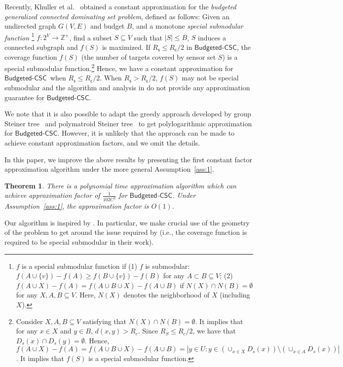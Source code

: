 \documentclass[11pt]{article}
\newcommand{\Z}{\mathbb{Z}}
\newcommand{\rednote}[1]{#1}
\newcommand{\bcsc}{$\mathsf{Budgeted}$-$\mathsf{CSC}$}
\newcommand{\Rc}{R_\mathsf{c}}
\newcommand{\Rs}{R_\mathsf{s}}
\newtheorem{theorem}{Theorem}
\begin{document}
Recently, Khuller et al.~\cite{khuller2014analyzing} obtained
a constant approximation for the {\em budgeted generalized connected dominating set problem},
defined as follows: Given an undirected graph $G(V,E)$ and budget $B$, and a  monotone {\em special submodular function}
\footnote{
	$f$ is a special submodular function if (1) $f$ is submodular:
	$f(A\cup\{v\})-f(A)\geq f(B\cup \{v\})-f(B)$ for any $A\subset B\subseteq V$;
	(2) $f(A\cup X)-f(A)=f(A\cup B\cup X)-f(A\cup B)$ if $N(X)\cap N(B)=\emptyset$
	for any $X,A,B\subseteq V$. Here, $N(X)$ denotes the neighborhood of $X$ (including $X$).
} $f: 2^V\rightarrow \Z^+$, find a subset $S\subseteq V$ such that $|S|\leq B$,
$S$ induces a connected subgraph
and $f(S)$ is maximized.
If $\Rs\leq \Rc/2$ in \bcsc, the coverage function $f(S)$ (the number of targets covered by sensor set $S$) is a special submodular function.\footnote{\rednote{Consider $X,A,B\subseteq V$ satisfying that $N(X)\cap N(B)=\emptyset$. It implies that for any $x\in X$ and $y\in B$, $d(x,y)> R_c$. Since $R_S\leq R_c/2$, we have that $D_s(x)\cap D_s(y)=\emptyset$. Hence, $f(A\cup X)-f(A)=f(A\cup B\cup X)-f(A\cup B) = \left|y\in U: y\in (\cup_{x\in X} D_s(x))\setminus (\cup_{x\in A} D_s(x)) \right|$. It implies that $f(S)$ is a special submodular function.}} 
Hence, we have a constant approximation
for \bcsc\ when $\Rs\leq \Rc/2$.
When $\Rs> \Rc/2$, $f(S)$ may not be special submodular and the algorithm and analysis
in \cite{khuller2014analyzing} do not provide any approximation guarantee for \bcsc.

We note that it is also possible to adapt the greedy approach developed by group Steiner tree~\cite{chekuri2006greedy} and
polymatroid Steiner tree~\cite{calinescu2005polymatroid} to get polylogarithmic approximation
for \bcsc. However, it is unlikely that the approach can be made to achieve constant approximation
factors, and we omit the details.

In this paper, we improve the above results by presenting the first constant
factor approximation algorithm under the more general Assumption~\ref{ass:1}.

\begin{theorem}
	There is a polynomial time approximation algorithm which can achieve
	approximation factor of $\frac{1}{102C^2}$ for \bcsc.
	Under Assumption~\ref{ass:1}, the approximation factor is $O(1)$.
	\label{th_bcsc}
\end{theorem}

Our algorithm is inspired by \cite{khuller2014analyzing}.
In particular, we make crucial use of the geometry of the problem
to get around the issue required by \cite{khuller2014analyzing}
(i.e., the coverage function is required to be special submodular in their work).
\end{document}

